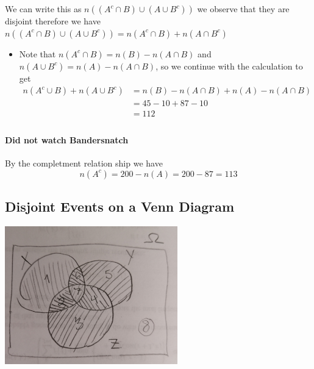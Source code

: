 \documentclass[11pt]{book}
\begin{document}
We can write this as $n\left(\left( A^{c} \cap B \right) \cup \left( A\cup B^{c}  \right) \right) $ we observe that they are disjoint therefore we have $n\left(\left( A^{c} \cap B \right) \cup \left( A\cup B^{c}  \right) \right) = n\left(A^{c} \cap B\right)  + n\left(A \cap B^{c} \right) $ 
\begin{itemize}
    \item Note that $n\left(A^{c} \cap B\right) = n\left(B\right)  - n\left(A\cap B\right) $ and $n\left(A\cup B^{c} \right) = n\left(A\right)  - n\left(A\cap B\right) $, so we continue with the calculation to get
        \begin{align*}
            n\left(A^{c} \cup B\right)  + n\left(A\cup B^{c} \right) &= n\left(B\right)  - n\left(A\cap B\right)  + n\left(A\right)  - n\left(A\cap B\right)   \\ 
            &= 45  - 10  + 87  - 10  \\ 
            &= 112  \\ 
        \end{align*}
\end{itemize}

\paragraph{Did not watch Bandersnatch} 
By the completment relation ship we have 
\[
n\left(A^{c} \right) = 200 - n\left(A \right)  = 200  - 87 = 113
\]



\subsection{Disjoint Events on a Venn Diagram}%
\label{sub:disjoint_events_on_a_venn_diagram}

\begin{center}
    \includegraphics[width=75mm]{assets/lec1_disj.jpg} 
\end{center}
\end{document}
